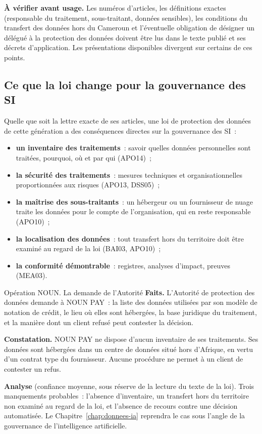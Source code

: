 \begin{boxalert}
\textbf{À vérifier avant usage.} Les numéros d'articles, les définitions
exactes (responsable du traitement, sous-traitant, données sensibles),
les conditions du transfert des données hors du Cameroun et l'éventuelle
obligation de désigner un délégué à la protection des données doivent
être lus dans le texte publié et ses décrets d'application. Les
présentations disponibles divergent sur certains de ces points.
\end{boxalert}

\subsection{Ce que la loi change pour la gouvernance des SI}

Quelle que soit la lettre exacte de ses articles, une loi de protection
des données de cette génération a des conséquences directes sur la
gouvernance des SI~:
\begin{itemize}
    \item \textbf{un inventaire des traitements}~: savoir quelles données
          personnelles sont traitées, pourquoi, où et par qui (APO14)~;
    \item \textbf{la sécurité des traitements}~: mesures techniques et
          organisationnelles proportionnées aux risques (APO13, DSS05)~;
    \item \textbf{la maîtrise des sous-traitants}~: un hébergeur ou un
          fournisseur de nuage traite les données pour le compte de
          l'organisation, qui en reste responsable (APO10)~;
    \item \textbf{la localisation des données}~: tout transfert hors du
          territoire doit être examiné au regard de la loi (BAI03, APO10)~;
    \item \textbf{la conformité démontrable}~: registres, analyses
          d'impact, preuves (MEA03).
\end{itemize}

\begin{boxscenario}{Opération NOUN. La demande de l'Autorité}
\textbf{Faits.} L'Autorité de protection des données demande à NOUN PAY~:
la liste des données utilisées par son modèle de notation de crédit, le
lieu où elles sont hébergées, la base juridique du traitement, et la
manière dont un client refusé peut contester la décision.

\medskip
\textbf{Constatation.} NOUN PAY ne dispose d'aucun inventaire de ses
traitements. Ses données sont hébergées dans un centre de données situé
hors d'Afrique, en vertu d'un contrat type du fournisseur. Aucune
procédure ne permet à un client de contester un refus.

\medskip
\textbf{Analyse} (confiance moyenne, sous réserve de la lecture du texte
de la loi). Trois manquements probables~: l'absence d'inventaire, un
transfert hors du territoire non examiné au regard de la loi, et
l'absence de recours contre une décision automatisée. Le
Chapitre~\ref{chap:donnees-ia} reprendra le cas sous l'angle de la
gouvernance de l'intelligence artificielle.
\end{boxscenario}

